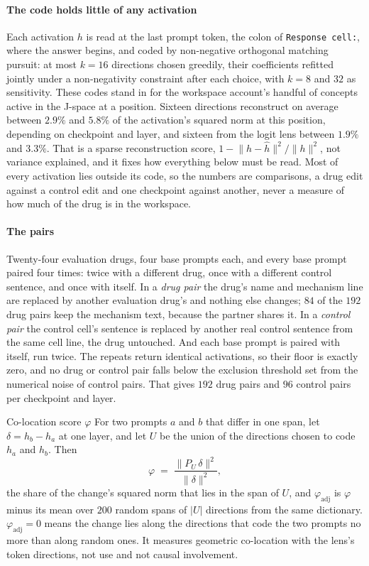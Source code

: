 \paragraph{The code holds little of any activation} Each activation $h$ is read
at the last prompt token, the colon of \texttt{Response cell:}, where the answer
begins, and coded by non-negative orthogonal matching pursuit: at most $k = 16$
directions chosen greedily, their coefficients refitted jointly under a
non-negativity constraint after each choice, with $k = 8$ and $32$ as
sensitivity. These codes stand in for the workspace account's handful of
concepts active in the J-space at a position. Sixteen directions reconstruct on average between $2.9\%$ and
$5.8\%$ of the activation's squared norm at this position, depending on
checkpoint and layer, and sixteen from the logit lens between $1.9\%$ and
$3.3\%$. That is a sparse reconstruction score,
$1 - \lVert h - \hat{h} \rVert^{2} / \lVert h \rVert^{2}$, not variance
explained, and it fixes how everything below must be read. Most of every
activation lies outside its code, so the numbers are comparisons, a drug edit
against a control edit and one checkpoint against another, never a measure of
how much of the drug is in the workspace.

\paragraph{The pairs} Twenty-four evaluation drugs, four base prompts each, and
every base prompt paired four times: twice with a different drug, once with a different control sentence, and once with itself. In a \emph{drug pair} the drug's name and
mechanism line are replaced by another evaluation drug's and nothing else
changes; $84$ of the $192$ drug pairs keep the mechanism text, because the
partner shares it. In a \emph{control pair} the control cell's sentence is
replaced by another real control sentence from the same cell line, the drug
untouched. And each base prompt is paired with itself, run twice. The repeats
return identical activations, so their floor is exactly zero, and no drug or
control pair falls below the exclusion threshold set from the numerical noise of
control pairs. That gives $192$ drug pairs and $96$ control pairs per checkpoint
and layer.

\begin{defn}{Co-location score $\varphi$}
For two prompts $a$ and $b$ that differ in one span, let
$\delta = h_b - h_a$ at one layer, and let $U$ be the union of the directions
chosen to code $h_a$ and $h_b$. Then
\[
  \varphi \;=\; \frac{\lVert P_U\, \delta \rVert^{2}}{\lVert \delta \rVert^{2}},
\]
the share of the change's squared norm that lies in the span of $U$, and
$\varphi_{\textrm{adj}}$ is $\varphi$ minus its mean over $200$ random spans of
$|U|$ directions from the same dictionary. $\varphi_{\textrm{adj}} = 0$ means
the change lies along the directions that code the two prompts no more than
along random ones. It measures geometric co-location with the lens's token
directions, not use and not causal involvement.
\end{defn}


